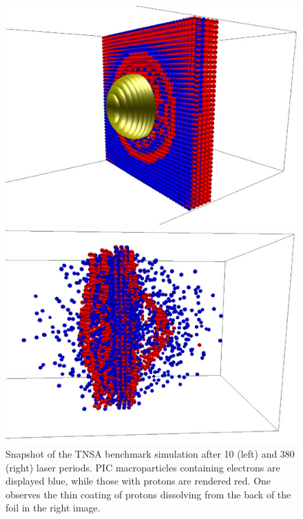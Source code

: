 \documentclass[conference]{IEEEtran}
\renewcommand{\~}{\widetilde }
\begin{document}
\begin{figure}[h]
	\begin{minipage}{0.48\columnwidth}
		\begin{center}
			\includegraphics[width=1.0\columnwidth]{frame_TNSA_000.ps}
		\end{center}
	\end{minipage}%
	\begin{minipage}{0.04\columnwidth}
		\hfill
	\end{minipage}%
	\begin{minipage}{0.48\columnwidth}
		\begin{center}
			\includegraphics[width=1.0\columnwidth]{frame_TNSA_001.ps}
		\end{center}
	\end{minipage}%
	\caption{Snapshot of the TNSA benchmark simulation after 10 (left) and 380 (right) laser periods. PIC macroparticles containing electrons are displayed blue, while those with protons are rendered red.
		One observes the thin coating of protons dissolving from the back of the foil in the right image.}
\end{figure}
\end{document}
